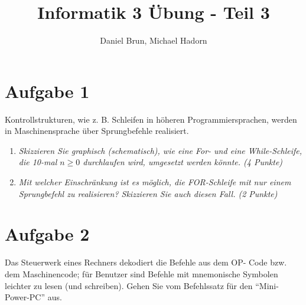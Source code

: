 \documentclass[10pt]{article}
\title{Informatik 3 Übung - Teil 3\vspace{-2ex}}
\author{Daniel Brun, Michael Hadorn\vspace{-2ex}}
\begin{document}
\maketitle

\section*{Aufgabe 1}
Kontrollstrukturen, wie z. B. Schleifen in höheren Programmiersprachen, werden in Maschinensprache über Sprungbefehle realisiert.
\begin{enumerate}[label=\alph*)]
	\item
		\textit{Skizzieren Sie graphisch (schematisch), wie eine For- und eine While-Schleife, die 10-mal \(n \ge 0\) durchlaufen wird, umgesetzt werden könnte. (4 Punkte)}
	
	
	\item
		\textit{Mit welcher Einschränkung ist es möglich, die FOR-Schleife mit nur einem Sprungbefehl zu realisieren? Skizzieren Sie auch diesen Fall. (2 Punkte)}
			
\end{enumerate}


\section*{Aufgabe 2}
Das Steuerwerk eines Rechners dekodiert die Befehle aus dem OP- Code bzw. dem Maschinencode; für Benutzer sind Befehle mit mnemonische Symbolen leichter zu lesen (und schreiben). Gehen Sie vom Befehlssatz für den "`Mini-Power-PC"' aus.
\end{document}
